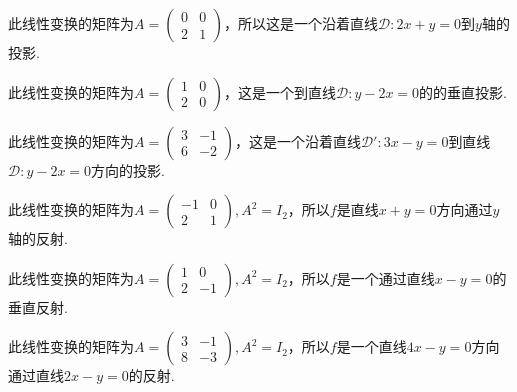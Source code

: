 \begin{solution}
  \begin{inparaenum}[(a)]
    \item 此线性变换的矩阵为$A=\begin{pmatrix}
      0 & 0 \\
      2 & 1
    \end{pmatrix}$，所以这是一个沿着直线$\mathscr D:2x+y=0$到$y$轴的投影.

    \item 此线性变换的矩阵为$A=\begin{pmatrix}
      1 & 0 \\
      2 & 0
    \end{pmatrix}$，这是一个到直线$\mathscr D:y-2x=0$的的垂直投影.

    \item 此线性变换的矩阵为$A=\begin{pmatrix}
      3 & -1 \\
      6 & -2
    \end{pmatrix}$，这是一个沿着直线$\mathscr D':3x-y=0$到直线$\mathscr D:y-2x=0$方向的投影.
  \end{inparaenum}
\end{solution}

\begin{solution}
  \begin{inparaenum}[(a)]
    \item 此线性变换的矩阵为$A=\begin{pmatrix}
      -1 & 0 \\
      2 & 1
    \end{pmatrix},A^2=I_2$，所以$f$是直线$x+y=0$方向通过$y$轴的反射.

    \item 此线性变换的矩阵为$A=\begin{pmatrix}
      1 & 0 \\
      2 & -1
    \end{pmatrix},A^2=I_2$，所以$f$是一个通过直线$x-y=0$的垂直反射.

    \item 此线性变换的矩阵为$A=\begin{pmatrix}
      3 & -1 \\
      8 & -3
    \end{pmatrix},A^2=I_2$，所以$f$是一个直线$4x-y=0$方向通过直线$2x-y=0$的反射.
  \end{inparaenum}
\end{solution}

